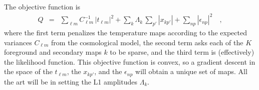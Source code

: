\documentclass[11pt]{article}
\begin{document}
The objective function is
\begin{eqnarray}
  Q &=&
    \sum_{\ell m} C_{\ell m}^{-1}\,|t_{\ell m}|^2
  + \sum_{k} \Lambda_k\,\sum_{p'} |x_{kp'}|
  + \sum_{np} |\epsilon_{np}|^2 \quad ,
\end{eqnarray}
where the first term penalizes the temperature maps according to the
expected variances $C_{\ell m}$ from the cosmological model, the
second term asks each of the $K$ foreground and secondary maps $k$ to
be sparse, and the third term is (effectively) the likelihood
function.
This objective function is convex, so a gradient descent in the space
of the $t_{\ell m}$, the $x_{kp'}$, and the $\epsilon_{np}$ will
obtain a unique set of maps.
All the art will be in setting the L1 amplitudes $\Lambda_k$.
\end{document}
